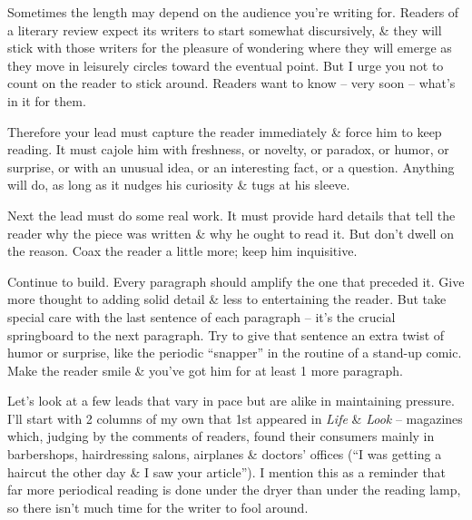 \documentclass{article}
\begin{document}
Sometimes the length may depend on the audience you're writing for. Readers of a literary review expect its writers to start somewhat discursively, \& they will stick with those writers for the pleasure of wondering where they will emerge as they move in leisurely circles toward the eventual point. But I urge you not to count on the reader to stick around. Readers want to know -- very soon -- what's in it for them.

Therefore your lead must capture the reader immediately \& force him to keep reading. It must cajole him with freshness, or novelty, or paradox, or humor, or surprise, or with an unusual idea, or an interesting fact, or a question. Anything will do, as long as it nudges his curiosity \& tugs at his sleeve.

Next the lead must do some real work. It must provide hard details that tell the reader why the piece was written \& why he ought to read it. But don't dwell on the reason. Coax the reader a little more; keep him inquisitive.

Continue to build. Every paragraph should amplify the one that preceded it. Give more thought to adding solid detail \& less to entertaining the reader. But take special care with the last sentence of each paragraph -- it's the crucial springboard to the next paragraph. Try to give that sentence an extra twist of humor or surprise, like the periodic ``snapper'' in the routine of a stand-up comic. Make the reader smile \& you've got him for at least 1 more paragraph.

Let's look at a few leads that vary in pace but are alike in maintaining pressure. I'll start with 2 columns of my own that 1st appeared in \textit{Life} \& \textit{Look} -- magazines which, judging by the comments of readers, found their consumers mainly in barbershops, hairdressing salons, airplanes \& doctors' offices (``I was getting a haircut the other day \& I saw your article''). I mention this as a reminder that far more periodical reading is done under the dryer than under the reading lamp, so there isn't much time for the writer to fool around.
\end{document}
